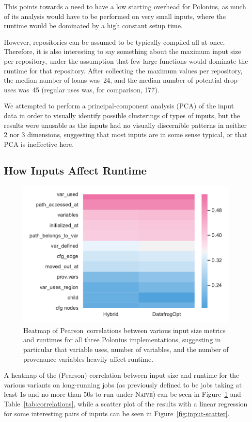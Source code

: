 \documentclass[11pt,a4paper,twoside,openany]{report}
\begin{document}
{This points towards a need to have a low starting overhead for Polonius, as
much of its analysis would have to be performed on very small inputs, where the
runtime would be dominated by a high constant setup time.

However, repositories can be assumed to be typically compiled all at once.
Therefore, it is also interesting to say something about the maximum input size
per repository, under the assumption that few large functions would dominate the
runtime for that repository. After collecting the maximum values per repository,
the median number of loans was~24, and the median number of potential drop-uses
was~45 (regular uses was, for comparison, 177).

We attempted to perform a principal-component analysis (PCA) of the input data
in order to visually identify possible clusterings of types of inputs, but the
results were unusable as the inputs had no visually discernible patterns in
neither 2 nor 3 dimensions, suggesting that most inputs are in some sense
typical, or that PCA is ineffective here.

\subsection{How Inputs Affect Runtime}\label{sec:inputs:correlation}
\begin{figure}
  \includegraphics[width=0.9\linewidth]{Graphs/corr_heatmap.pdf}
  \caption[Heatmap of Input Sizes Affecting Runtime]{Heatmap of
    Pearson~correlations between various input size metrics and runtimes for
    all three Polonius implementations, suggesting in particular that variable
    uses, number of variables, and the number of provenance variables heavily
    affect runtime.}
  \label{fig:corr-heatmap}
\end{figure}
A heatmap of the (Pearson) correlation between input size and runtime for the
various variants on long-running jobs (as previously defined to be jobs taking
at least 1s and no more than 50s to run under \textsc{Naive}) can be seen in
Figure~\ref{fig:corr-heatmap} and Table~\ref{tab:correlations}, while a scatter
plot of the results with a linear regression for some interesting pairs of
inputs can be seen in Figure~\ref{fig:input-scatter}.

}
\end{document}
